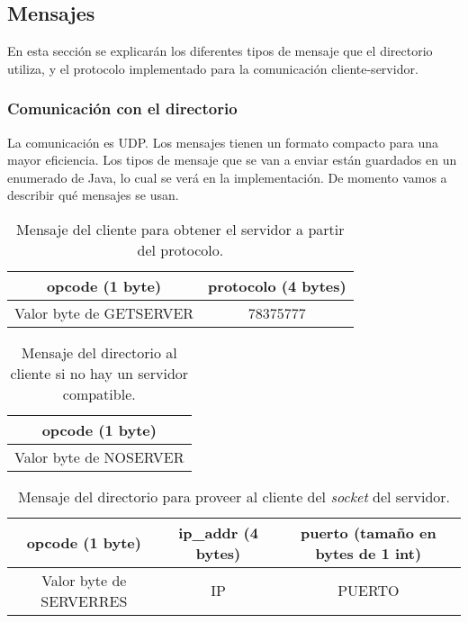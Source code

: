 \documentclass{article}
\begin{document}
\newpage

\subsection{Mensajes}

En esta sección se explicarán los diferentes tipos de mensaje que el directorio utiliza, y el protocolo implementado para la comunicación cliente-servidor.

\subsubsection{Comunicación con el directorio}

La comunicación es UDP. Los mensajes tienen un formato compacto para una mayor eficiencia. Los tipos de mensaje que se van a enviar están guardados en un enumerado de Java, lo cual se verá en la implementación. De momento vamos a describir qué mensajes se usan.

\begin{table}[h!] \footnotesize
  \begin{tabular}{| c | c |}
  	\hline
      opcode (1 byte) & protocolo (4 bytes) \\
      \hline
      Valor byte de GETSERVER & 78375777 \\
      \hline
  \end{tabular}
  \caption{Mensaje del cliente para obtener el servidor a partir del protocolo.}
\end{table}


\begin{table}[h!]\footnotesize
  \begin{tabular}{| c |}
  	\hline
      opcode (1 byte) \\
      \hline
      Valor byte de NOSERVER \\
      \hline
  \end{tabular}
  \caption{Mensaje del directorio al cliente si no hay un servidor compatible.}
\end{table}

\begin{table}[h!]\footnotesize
  \begin{tabular}{| c | c | c |}
  	\hline
      opcode (1 byte) & ip\_addr (4 bytes) & puerto (tamaño en bytes de 1 int) \\
      \hline
      Valor byte de SERVERRES & IP & PUERTO \\
      \hline
  \end{tabular}
  \caption{Mensaje del directorio para proveer al cliente del \textit{socket} del servidor.}
\end{table}
\end{document}
